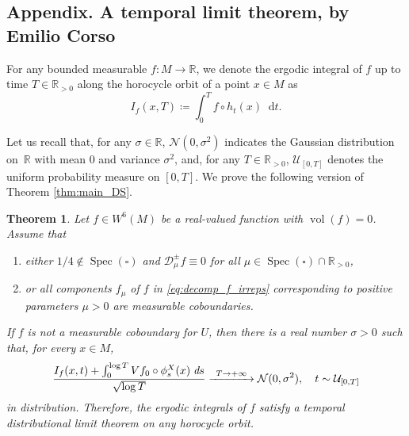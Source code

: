 \documentclass[10pt]{amsart}
\newenvironment{enumeratea}
{\bgroup\def\theenumi{\alph{enumi}}\begin{enumerate}}
{\end{enumerate}\egroup}
\newcommand\To[1]{\mathchoice{\xrightarrow{\kern4pt#1\kern3pt}}{\stackrel{#1}{\longrightarrow}}{}{}}
\newcommand \R{\mathbb{R}}
\newcommand {\cN}{\mathcal{N}}
\newcommand*{\diff}{\mathop{}\!\mathrm{d}}
\newcommand{\Dpm}[1]{\mathcal{D}_\mu^{\pm} #1}
\DeclareMathOperator{\vol}{vol}
\DeclareMathOperator{\Spec}{Spec}
\newtheorem{theorem}{Theorem}
\theoremstyle{definition}
\begin{document}
\begin{appendix}
\let\oldthefootnote\thefootnote
\renewcommand{\thefootnote}{*}
\section*{Appendix. A temporal limit theorem, by Emilio Corso\texorpdfstring{\protect\footnotemark}{fn}}

\setcounter{footnote}{0}
\let\thefootnote\oldthefootnote

For any bounded measurable $f\colon M\to \R$, we denote the ergodic integral of $f$ up to time $T\in \R_{>0}$ along the horocycle orbit of a point $x\in M$ as
\begin{equation*}
I_f(x,T)\coloneqq\int_0^{T}f\circ h_t(x)\diff t.
\end{equation*}

Let us recall that, for any $\sigma\in \R$, $\cN(0,\sigma^{2})$ indicates the Gaussian distribution on~$\R$ with mean $0$ and variance $\sigma^{2}$, and, for any $T\in \R_{>0}$, $\mathcal{U}_{[0,T]}$ denotes the uniform probability measure on $[0,T]$.
We prove the following version of Theorem \ref{thm:main_DS}.


\begin{theorem}
\label{temporalDLT}
Let $f \in W^6(M)$ be a real-valued function with $\vol(f)=0$.
Assume that
\begin{enumeratea}
\item\label{temporalDLTa}
either $1/4 \notin \Spec(\square)$ and $\Dpm{f} \equiv 0$ for all $\mu \in \Spec(\square) \cap \R_{>0}$,
\item\label{temporalDLTb}
or all components $f_\mu$ of $f$ in \eqref{eq:decomp_f_irreps} corresponding to positive parameters $\mu >0$ are measurable coboundaries.
\end{enumeratea}
If $f$ is not a measurable coboundary for $U$, then there is a real number $\sigma>0$ such that, for every $x \in M$,
\begin{equation}
\label{distrlimit}
\frac{I_f(x,t)+\int_0^{\log{T}}Vf_0\circ\phi^{X}_s(x)\;\emph{d}s}{\sqrt{\log{T}}}\To{T\to+\infty}\cN(0,\sigma^{2}), \quad t\sim \mathcal{U}_{[0,T]}
\end{equation}
in distribution. Therefore, the ergodic integrals of $f$ satisfy a temporal distributional limit theorem on any horocycle orbit.
\end{theorem}



\end{appendix}
\end{document}
